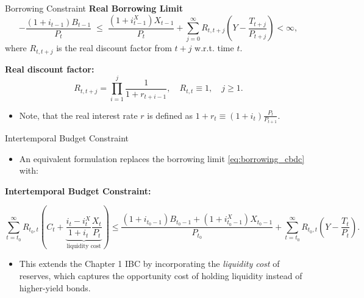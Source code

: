 \documentclass[11pt,aspectratio=169]{beamer}
\begin{document}
\begin{frame}{Borrowing Constraint}
\small
\textbf{Real Borrowing Limit}
\begin{equation}
-\frac{(1+i_{t-1})B_{t-1}}{P_t} 
\;\le\;
\frac{(1+i_{t-1}^{X})X_{t-1}}{P_t}
+ \sum_{j=0}^{\infty} R_{t,t+j} 
\left( Y - \frac{T_{t+j}}{P_{t+j}} \right)
< \infty,
\label{eq:borrowing_cbdc}
\end{equation}
\hspace{0.65cm} where $R_{t,t+j}$ is the real discount factor from $t+j$ w.r.t. time $t$.

\vspace{0.25cm}
\noindent\textbf{Real discount factor:}
\begin{equation}
R_{t,t+j} = \prod_{i=1}^{j} \frac{1}{1 + r_{t+i-1}}, 
\quad R_{t,t} \equiv 1, 
\quad j \ge 1.
\label{eq:real_discount_fac}
\end{equation}

\begin{itemize} 
    \item Note, that the real interest rate $r$ is defined as $1+r_t \equiv (1+i_t)\frac{P_t}{P_{t+1}}$. 

\end{itemize}
\end{frame}


\begin{frame}[label=borrowing]{Intertemporal Budget Constraint}
\small

\begin{itemize}
    \item An equivalent formulation replaces the borrowing limit \eqref{eq:borrowing_cbdc} with:
\end{itemize}

\vspace{0.25cm}

\textbf{Intertemporal Budget Constraint:}

\begin{equation}
\sum_{t=t_0}^{\infty} 
R_{t_0,t}
\left(
C_t 
+
\underbrace{
\frac{i_t - i_t^{X}}{1+i_t}\frac{X_t}{P_t}
}_{\text{liquidity cost}}
\right)
\le
\frac{(1+i_{t_0-1})B_{t_0-1} 
+ (1+i_{t_0-1}^{X})X_{t_0-1}}{P_{t_0}}
+
\sum_{t=t_0}^{\infty} 
R_{t_0,t}
\left(
Y - \frac{T_t}{P_t}
\right).
\label{eq:ibc_cbdc}
\end{equation}

\begin{itemize}
  \item This extends the Chapter 1 IBC by incorporating the \emph{liquidity cost} 
  of reserves, which captures the opportunity cost of holding liquidity instead 
  of higher-yield bonds.
\end{itemize}

\vspace{0.3cm}

\begin{center}
\hyperlink{borrowing_proof}{}
\end{center}

\end{frame}
\end{document}

